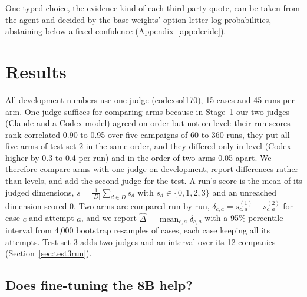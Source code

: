 \documentclass[11pt]{article}
\begin{document}
One typed choice, the evidence kind of each third-party quote, can be taken from the agent and decided by the base
weights' option-letter log-probabilities, abstaining below a fixed confidence (Appendix~\ref{app:decide}).

\section{Results}
\label{sec:results}

All development numbers use one judge (codexsol170), 15 cases and 45 runs per arm. One judge suffices for
comparing arms because in Stage~1 our two judges (Claude and a Codex model) agreed on order but not on level: their run
scores rank-correlated 0.90 to 0.95 over five campaigns of 60 to 360 runs, they put all five arms of test set 2 in the
same order, and they differed only in level (Codex higher by 0.3 to 0.4 per run) and in the order of two arms
0.05 apart. We therefore compare arms with one judge on development, report differences rather than levels, and
add the second judge for the test. A run's score is the mean of its
judged dimensions, $s = \tfrac{1}{|D|}\sum_{d \in D} s_d$ with $s_d \in \{0,1,2,3\}$ and an unreached dimension
scored 0. Two arms are compared run by run, $\delta_{c,a} = s^{(1)}_{c,a} - s^{(2)}_{c,a}$ for case $c$ and attempt $a$,
and we report $\hat\Delta = \operatorname{mean}_{c,a} \delta_{c,a}$ with a 95\% percentile interval from 4,000 bootstrap
resamples of cases, each case keeping all its attempts. Test set 3 adds two judges and an interval over its 12
companies (Section~\ref{sec:test3run}).

\subsection{Does fine-tuning the 8B help?}
\end{document}
